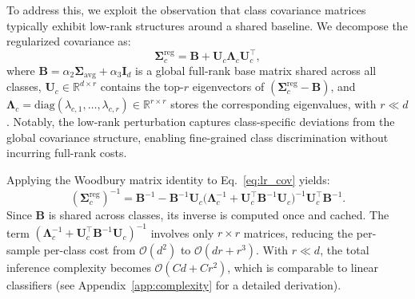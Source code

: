 \documentclass{article}
\begin{document}
To address this, we exploit the observation that class covariance matrices typically exhibit low-rank structures around a shared baseline. We decompose the regularized covariance as:
\begin{equation}
    \mathbf{\Sigma}_c^{\text{reg}} = \mathbf{B} + \mathbf{U}_c \boldsymbol{\Lambda}_c \mathbf{U}_c^\top,
    \label{eq:lr_cov}
\end{equation}
where $\mathbf{B} = \alpha_2 \mathbf{\Sigma}_{\text{avg}} + \alpha_3 \mathbf{I}_d$ is a global full-rank base matrix shared across all classes, $\mathbf{U}_c \in \mathbb{R}^{d \times r}$ contains the top-$r$ eigenvectors of $(\mathbf{\Sigma}_c^{\text{reg}} - \mathbf{B})$, and $\boldsymbol{\Lambda}_c = \mathrm{diag}(\lambda_{c,1}, \ldots, \lambda_{c,r}) \in \mathbb{R}^{r \times r}$ stores the corresponding eigenvalues, with $r \ll d$. Notably, the low-rank perturbation captures class-specific deviations from the global covariance structure, enabling fine-grained class discrimination without incurring full-rank costs.

Applying the Woodbury matrix identity to Eq.~\eqref{eq:lr_cov} yields:
\begin{equation}
    (\mathbf{\Sigma}_c^{\text{reg}})^{-1} = \mathbf{B}^{-1} - \mathbf{B}^{-1} \mathbf{U}_c \big(\boldsymbol{\Lambda}_c^{-1} + \mathbf{U}_c^\top \mathbf{B}^{-1} \mathbf{U}_c\big)^{-1} \mathbf{U}_c^\top \mathbf{B}^{-1}.
    \label{eq:woodbury}
\end{equation}
Since $\mathbf{B}$ is shared across classes, its inverse is computed once and cached. The term $(\boldsymbol{\Lambda}_c^{-1} + \mathbf{U}_c^\top \mathbf{B}^{-1} \mathbf{U}_c)^{-1}$ involves only $r \times r$ matrices, reducing the per-sample per-class cost from $\mathcal{O}(d^2)$ to $\mathcal{O}(dr + r^3)$. With $r \ll d$, the total inference complexity becomes $\mathcal{O}(Cd + Cr^2)$, which is comparable to linear classifiers (see Appendix~\ref{app:complexity} for a detailed derivation).
\end{document}
